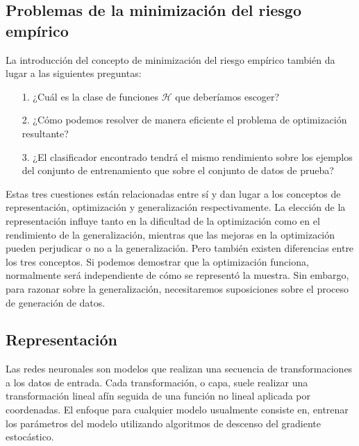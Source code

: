 \documentclass[oneside,openright,titlepage,numbers=noenddot,openany,headinclude,footinclude=true,
cleardoublepage=empty,abstractoff,BCOR=5mm,paper=a4,fontsize=12pt,main=spanish]{scrreprt}
\begin{document}
\subsection{Problemas de la minimización del riesgo empírico}

La introducción del concepto de minimización del riesgo empírico también da lugar a las siguientes preguntas:

\begin{itemize}
    \item[1.] ¿Cuál es la clase de funciones $\mathcal{H}$ que deberíamos escoger?
    \item[2.] ¿Cómo podemos resolver de manera eficiente el problema de optimización resultante?
    \item[3.] ¿El clasificador encontrado tendrá el mismo rendimiento sobre los ejemplos del conjunto de entrenamiento que sobre el conjunto de datos de prueba?
\end{itemize}

Estas tres cuestiones están relacionadas entre sí y dan lugar a los conceptos de representación, optimización y generalización respectivamente. La elección de la representación influye tanto en la dificultad de la optimización como en el rendimiento de la generalización, mientras que las mejoras en la optimización pueden perjudicar o no a la generalización. Pero también existen diferencias entre los tres conceptos. Si podemos demostrar que la optimización funciona, normalmente será independiente de cómo se representó la muestra. Sin embargo, para razonar sobre la generalización, necesitaremos suposiciones sobre el proceso de generación de datos.

\subsection{Representación}


Las redes neuronales son modelos que realizan una secuencia de transformaciones a los datos de entrada. Cada transformación, o capa, suele realizar una transformación lineal afín seguida de una función no lineal aplicada por coordenadas. El enfoque para cualquier modelo usualmente consiste en, entrenar los parámetros del modelo utilizando algoritmos de descenso del gradiente estocástico.
\end{document}
